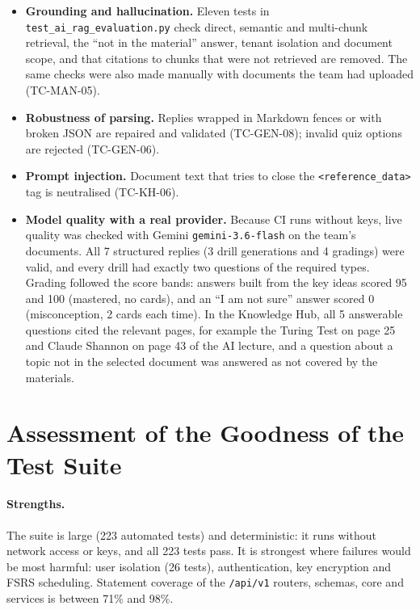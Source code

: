 \begin{itemize}
  \item \textbf{Grounding and hallucination.} Eleven tests in \texttt{test\_ai\_rag\_evaluation.py} check direct,
  semantic and multi-chunk retrieval, the ``not in the material'' answer, tenant isolation and document scope, and
  that citations to chunks that were not retrieved are removed. The same checks were also made manually with
  documents the team had uploaded (TC-MAN-05).
  \item \textbf{Robustness of parsing.} Replies wrapped in Markdown fences or with broken JSON are repaired and
  validated (TC-GEN-08); invalid quiz options are rejected (TC-GEN-06).
  \item \textbf{Prompt injection.} Document text that tries to close the \texttt{<reference\_data>} tag is
  neutralised (TC-KH-06).
  \item \textbf{Model quality with a real provider.} Because CI runs without keys, live quality was checked with
  Gemini \texttt{gemini-3.6-flash} on the team's documents. All 7 structured replies (3 drill generations and
  4 gradings) were valid, and every drill had exactly two questions of the required types. Grading followed the
  score bands: answers built from the key ideas scored 95 and 100 (mastered, no cards), and an
  ``I am not sure'' answer scored 0 (misconception, 2 cards each time). In the Knowledge Hub, all 5 answerable
  questions cited the relevant pages, for example the Turing Test on page 25 and Claude Shannon on page 43 of the
  AI lecture, and a question about a topic not in the selected document was answered as not covered by the
  materials.
\end{itemize}

\section{Assessment of the Goodness of the Test Suite}\label{sec:goodness}

\paragraph{Strengths.} The suite is large (223 automated tests) and deterministic: it runs without network access
or keys, and all 223 tests pass. It is strongest where failures would be most harmful: user
isolation (26 tests), authentication, key encryption and FSRS scheduling. Statement coverage of the
\texttt{/api/v1} routers, schemas, core and services is between 71\% and 98\%.

